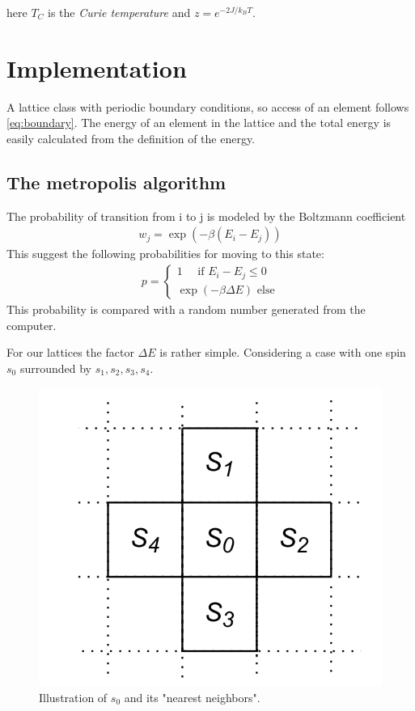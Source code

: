\documentclass[11pt,a4paper,english]{article}
\numberwithin{equation}{section}
\begin{document}
here $T_C$ is the \emph{Curie temperature} and $z = e^{-2J/k_B T}$. 

\section{Implementation}

A lattice class with periodic boundary conditions, so access of an
element follows \eqref{eq:boundary}. The energy of an element in the 
lattice and the total energy is easily calculated from the definition
of the energy. 

\subsection{The metropolis algorithm}

The probability of transition from i to j 
is modeled by the Boltzmann coefficient
\begin{gather}
w_j = \exp(-\beta (E_i - E_j))
\end{gather}
This suggest the following probabilities for moving to this state:
\begin{gather}
p = \begin{cases}
1 \quad\text{ if }  E_i - E_j \le 0\\
\exp(-\beta \Delta E) \text{ else}
\end{cases}
\label{eq:transition}
\end{gather}
This probability is compared with a random number generated from 
the computer.

For our lattices the factor $\Delta E$ is rather simple. Considering 
a case with one spin $s_0$ surrounded by $s_1,s_2,s_3, s_4$. 

\begin{figure}[H]
\centering
\includegraphics[scale=0.2]{pics/full_lattice.png}
\caption{ Illustration of $s_0$ and its "nearest neighbors".}
\label{fig:spin_neighbours}
\end{figure}
\end{document}
